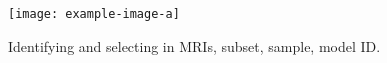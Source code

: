 
\begin{figure}
    \centering
    \texttt{[image: example-image-a]}
    \caption[A simple subset selection example]{\color{red} Identifying and selecting in MRIs, subset, sample, model ID.}
\end{figure}

